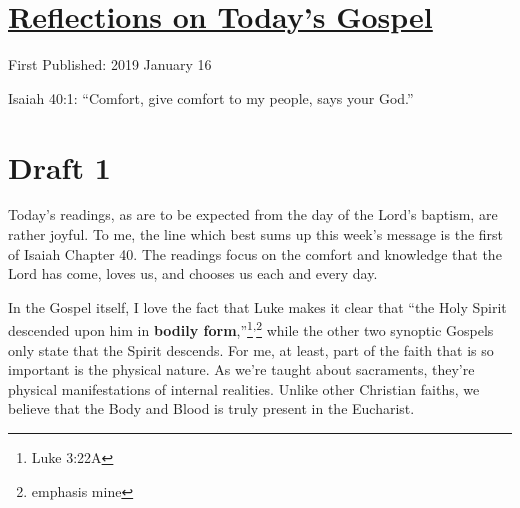 \documentclass[12pt]{article}[titlepage]
\newcommand{\say}[1]{``#1''}
\newcommand{\1}{\={a}}
\newcommand{\2}{\={e}}
\newcommand{\3}{\={\i}}
\newcommand{\4}{\=o}
\newcommand{\5}{\=u}
\newcommand{\6}{\={A}}
\renewcommand{\,}{\textsuperscript{,}}
\begin{document}
\doublespacing
\section{\href{reflections-on-readings-baptism-c.html}{Reflections on Today's Gospel}}
First Published: 2019 January 16

Isaiah 40:1: \say{Comfort, give comfort to my people, says your God.}

\section{Draft 1}
Today's readings, as are to be expected from the day of the Lord's baptism, are rather joyful.
To me, the line which best sums up this week's message is the first of Isaiah Chapter 40.
The readings focus on the comfort and knowledge that the Lord has come, loves us, and chooses us each and every day.

In the Gospel itself, I love the fact that Luke makes it clear that \say{the Holy Spirit descended upon him in \textbf{bodily form},}\footnote{Luke 3:22A}\,\footnote{emphasis mine} while the other two synoptic Gospels only state that the Spirit descends.
For me, at least, part of the faith that is so important is the physical nature.
As we're taught about sacraments, they're physical manifestations of internal realities.
Unlike other Christian faiths, we believe that the Body and Blood is truly present in the Eucharist.
\end{document}
